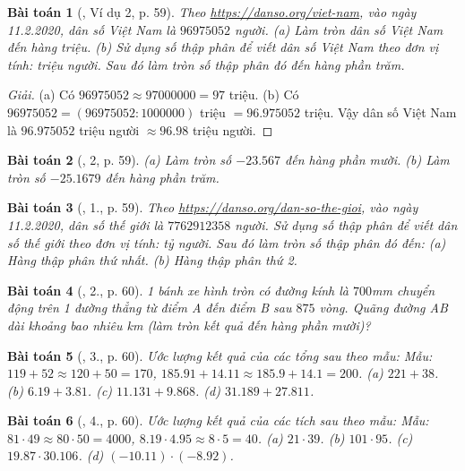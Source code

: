 \documentclass{article}
\newtheorem{baitoan}{Bài toán}
\begin{document}
\begin{baitoan}[\cite{SGK_Toan_6_Canh_Dieu_tap_2}, Ví dụ 2, p. 59]
	Theo \url{https://danso.org/viet-nam}, vào ngày 11.2.2020, dân số Việt Nam là $96975052$ người. (a) Làm tròn dân số Việt Nam đến hàng triệu. (b) Sử dụng số thập phân để viết dân số Việt Nam theo đơn vị tính: triệu người. Sau đó làm tròn số thập phân đó đến hàng phần trăm.
\end{baitoan}

\begin{proof}[Giải]
	(a) Có $96975052\approx97000000 = 97$ triệu. (b) Có $96975052 = (96975052:1000000)$ triệu $= 96.975052$ triệu. Vậy dân số Việt Nam là $96.975052$ triệu người $\approx96.98$ triệu người.
\end{proof}

\begin{baitoan}[\cite{SGK_Toan_6_Canh_Dieu_tap_2}, 2, p. 59]
	(a) Làm tròn số $-23.567$ đến hàng phần mười. (b) Làm tròn số $-25.1679$ đến hàng phần trăm.
\end{baitoan}

\begin{baitoan}[\cite{SGK_Toan_6_Canh_Dieu_tap_2}, 1., p. 59]
	Theo \url{https://danso.org/dan-so-the-gioi}, vào ngày 11.2.2020, dân số thế giới là $7762912358$ người. Sử dụng số thập phân để viết dân số thế giới theo đơn vị tính: tỷ người. Sau đó làm tròn số thập phân đó đến: (a) Hàng thập phân thứ nhất. (b) Hàng thập phân thứ 2.
\end{baitoan}

\begin{baitoan}[\cite{SGK_Toan_6_Canh_Dieu_tap_2}, 2., p. 60]
	1 bánh xe hình tròn có đường kính là $700$\emph{mm} chuyển động trên 1 đường thẳng từ điểm A đến điểm B sau $875$ vòng. Quãng đường AB dài khoảng bao nhiêu \emph{km} (làm tròn kết quả đến hàng phần mười)?
\end{baitoan}

\begin{baitoan}[\cite{SGK_Toan_6_Canh_Dieu_tap_2}, 3., p. 60]
	Ước lượng kết quả của các tổng sau theo mẫu: Mẫu: $119 + 52\approx120 + 50 = 170$, $185.91 + 14.11\approx185.9 + 14.1 = 200$. (a) $221 + 38$. (b) $6.19 + 3.81$. (c) $11.131 + 9.868$. (d) $31.189 + 27.811$.
\end{baitoan}

\begin{baitoan}[\cite{SGK_Toan_6_Canh_Dieu_tap_2}, 4., p. 60]
	Ước lượng kết quả của các tích sau theo mẫu: Mẫu: $81\cdot49\approx80\cdot50 = 4000$, $8.19\cdot4.95\approx8\cdot5 = 40$. (a) $21\cdot39$. (b) $101\cdot95$. (c) $19.87\cdot30.106$. (d) $(-10.11)\cdot(-8.92)$.
\end{baitoan}
\end{document}
